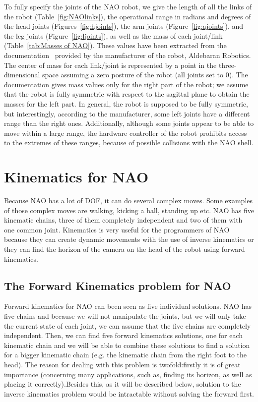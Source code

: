 To fully specify the joints of the NAO robot, we give the length of all the links of the robot (Table~\ref{fig:NAOlinks}), the operational range in radians and degrees of the head joints (Figures~\ref{fig:hjoints}), the arm joints (Figure~\ref{fig:ajoints}), and the leg joints (Figure~\ref{fig:ljoints}), as well as the mass of each joint/link (Table~\ref{tab:Masses of NAO}). These values have been extracted from the documentation~\cite{AldebaranNaoDoc} provided by the manufacturer of the robot, Aldebaran Robotics. The center of mass for each link/joint is represented by a point in the three-dimensional space assuming a zero posture of the robot (all joints set to $0$). The documentation gives mass values only for the right part of the robot; we assume that the robot is fully symmetric with respect to the sagittal plane to obtain the masses for the left part. In general, the robot is supposed to be fully symmetric, but interestingly, according to the manufacturer, some left joints have a different range than the right ones. Additionally, although some joints appear to be able to move within a large range, the hardware controller of the robot prohibits access to the extremes of these ranges, because of possible collisions with the NAO shell.

\newpage
\section{Kinematics for NAO}
Because NAO has a lot of DOF, it can do several complex moves. Some examples of those complex moves are walking, kicking a ball, standing up etc. NAO has five kinematic chains, three of them completely independent and two of them with one common joint. Kinematics is very useful for the programmers of NAO because they can create dynamic movements with the use of inverse kinematics or they can find the horizon of the camera on the head of the robot using forward kinematics.

\subsection{The Forward Kinematics problem for NAO}
Forward kinematics for NAO can been seen as five individual solutions. NAO has five chains and because we will not manipulate the joints, but we will only take the current state of each joint, we can assume that the five chains are completely independent. Then, we can find five forward kinematics solutions, one for each kinematic chain and we will be able to combine these solutions to find a solution for a bigger kinematic chain (e.g. the kinematic chain from the right foot to the head). The reason for dealing with this problem is twofold:firstly it is of great importance (concerning many applications, such as, finding its horizon, as well as placing it correctly).Besides this, as it will be described below, solution to the inverse kinematics problem would be intractable without solving the forward first.

